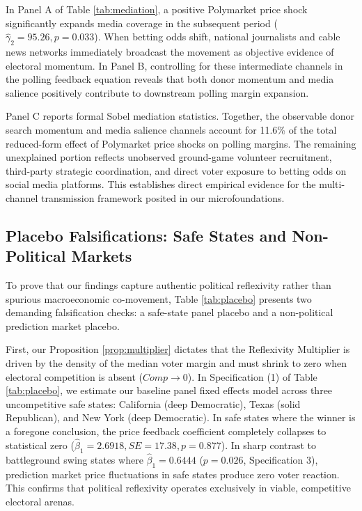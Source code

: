 \documentclass[12pt]{article}
\begin{document}


In Panel A of Table \ref{tab:mediation}, a positive Polymarket price shock significantly expands media coverage in the subsequent period ($\hat{\gamma}_2 = 95.26, p = 0.033$). When betting odds shift, national journalists and cable news networks immediately broadcast the movement as objective evidence of electoral momentum. In Panel B, controlling for these intermediate channels in the polling feedback equation reveals that both donor momentum and media salience positively contribute to downstream polling margin expansion. 

Panel C reports formal Sobel mediation statistics. Together, the observable donor search momentum and media salience channels account for 11.6\% of the total reduced-form effect of Polymarket price shocks on polling margins. The remaining unexplained portion reflects unobserved ground-game volunteer recruitment, third-party strategic coordination, and direct voter exposure to betting odds on social media platforms. This establishes direct empirical evidence for the multi-channel transmission framework posited in our microfoundations.

\subsection{Placebo Falsifications: Safe States and Non-Political Markets}
To prove that our findings capture authentic political reflexivity rather than spurious macroeconomic co-movement, Table \ref{tab:placebo} presents two demanding falsification checks: a safe-state panel placebo and a non-political prediction market placebo.



First, our Proposition \ref{prop:multiplier} dictates that the Reflexivity Multiplier is driven by the density of the median voter margin and must shrink to zero when electoral competition is absent ($Comp \to 0$). In Specification (1) of Table \ref{tab:placebo}, we estimate our baseline panel fixed effects model across three uncompetitive safe states: California (deep Democratic), Texas (solid Republican), and New York (deep Democratic). In safe states where the winner is a foregone conclusion, the price feedback coefficient completely collapses to statistical zero ($\hat{\beta}_1 = 2.6918, SE = 17.38, p = 0.877$). In sharp contrast to battleground swing states where $\hat{\beta}_1 = 0.6444$ ($p = 0.026$, Specification 3), prediction market price fluctuations in safe states produce zero voter reaction. This confirms that political reflexivity operates exclusively in viable, competitive electoral arenas.
\end{document}
